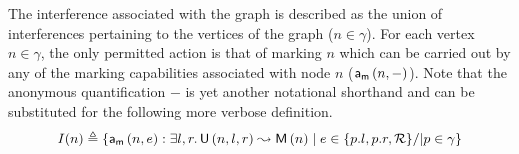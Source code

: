 The interference associated with the graph is described as the union
of interferences pertaining to the vertices of the graph ($n \in
\gamma$). For each vertex $n \in \gamma$, the only permitted action is
that of marking $n$ which can be carried out by any of the marking
capabilities associated with node $n$ ($\mathsf{a}_{\textsf{m}}\left(n, -\right)$). Note that the
anonymous quantification $-$ is yet another notational shorthand and
can be substituted for the following more verbose definition.\vspace*{-7pt}
%
\[
I(n) \triangleq
\{ \mathsf{a}_{\textsf{m}}\left(n, e\right) : \exists l, r.\, \textsf{U}\left(n, l, r\right) \mathrel{\leadsto} \textsf{M}\left(n\right)
\mid e \in \{p.l,
  p.r, \mathcal{R}\} /| p \in \gamma\}
\]

\begin{figure}
  \begin{minipage}{0.98\linewidth}
\end{minipage}
\end{figure}
